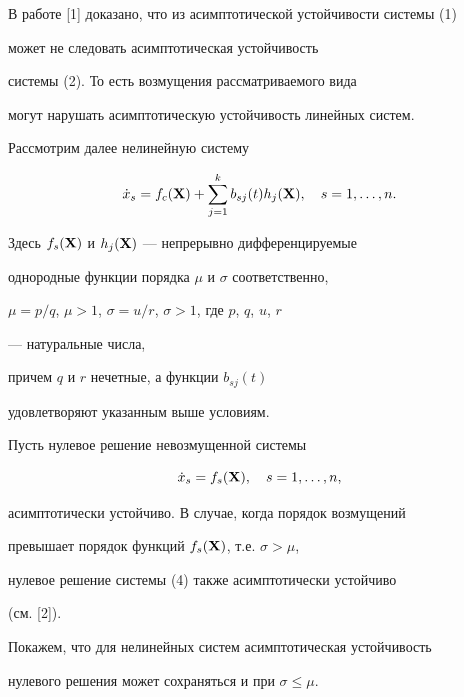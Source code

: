 В работе [1] доказано, что из асимптотической устойчивости системы (1) 


может не следовать асимптотическая устойчивость 


системы (2). То есть возмущения рассматриваемого вида 


могут нарушать асимптотическую устойчивость линейных систем. 


 


Рассмотрим далее нелинейную систему 


\begin{equation} 


\Dot x_s=f_c(\bx)+\sum^k_{j=1}b_{sj}(t)h_j(\bx),\quad 


s=1,\dotsc,n. 


\end{equation} 


Здесь $f_s(\bold X)$ и $h_j(\bold X)$ --- непрерывно дифференцируемые 


однородные функции порядка $\mu$ и $\sigma$ соответственно, 


$\mu=p/q$, $\mu>1$, $\sigma=u/r$, $\sigma>1$, где $p$, $q$, $u$, $r$ 


--- натуральные числа, 


причем $q$ и $r$ нечетные, а функции $b_{sj}(t)$ 


удовлетворяют указанным выше условиям. 


 


Пусть нулевое решение невозмущенной системы 


\begin{equation} 


\Dot x_s=f_s(\bx),\quad s=1,\dotsc,n, 


\end{equation} 


асимптотически устойчиво. В случае, когда порядок возмущений 


превышает порядок функций $f_s(\bold X)$, т.е. $\sigma>\mu$,


нулевое решение системы (4) также асимптотически устойчиво 


(см. [2]). 


 


Покажем, что для нелинейных систем асимптотическая устойчивость 


нулевого решения может сохраняться и при $\sigma\le\mu$. 


\medskip 


